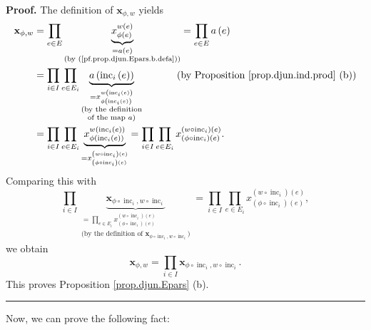 \documentclass[numbers=enddot,12pt,final,onecolumn,notitlepage,abstracton]{scrartcl}
\theoremstyle{definition}
\newenvironment{proof}[1][Proof]{\noindent\textbf{#1.} }{\ \rule{0.5em}{0.5em}}
\let\prodnonlimits\prod
\renewcommand{\prod}{\prodnonlimits\limits}
\newenvironment{verlong}{}{}
\begin{document}
\begin{verlong}
\begin{footnotesize}
\begin{proof}
The definition of $\mathbf{x}_{\phi,w}$ yields%
\begin{align*}
\mathbf{x}_{\phi,w}  &  =\prod_{e\in E}\underbrace{x_{\phi\left(  e\right)
}^{w\left(  e\right)  }}_{\substack{=a\left(  e\right)  \\\text{(by
(\ref{pf.prop.djun.Epars.b.defa}))}}}=\prod_{e\in E}a\left(  e\right) \\
&  =\prod_{i\in I}\prod_{e\in E_{i}}\underbrace{a\left(  \operatorname*{inc}%
\nolimits_{i}\left(  e\right)  \right)  }_{\substack{=x_{\phi\left(
\operatorname*{inc}\nolimits_{i}\left(  e\right)  \right)  }^{w\left(
\operatorname*{inc}\nolimits_{i}\left(  e\right)  \right)  }\\\text{(by the
definition}\\\text{of the map }a\text{)}}}\ \ \ \ \ \ \ \ \ \ \left(  \text{by
Proposition \ref{prop.djun.ind.prod} (b)}\right) \\
&  =\prod_{i\in I}\prod_{e\in E_{i}}\underbrace{x_{\phi\left(
\operatorname*{inc}\nolimits_{i}\left(  e\right)  \right)  }^{w\left(
\operatorname*{inc}\nolimits_{i}\left(  e\right)  \right)  }}_{=x_{\left(
\phi\circ\operatorname*{inc}\nolimits_{i}\right)  \left(  e\right)  }^{\left(
w\circ\operatorname*{inc}\nolimits_{i}\right)  \left(  e\right)  }}%
=\prod_{i\in I}\prod_{e\in E_{i}}x_{\left(  \phi\circ\operatorname*{inc}%
\nolimits_{i}\right)  \left(  e\right)  }^{\left(  w\circ\operatorname*{inc}%
\nolimits_{i}\right)  \left(  e\right)  }.
\end{align*}
Comparing this with%
\[
\prod_{i\in I}\underbrace{\mathbf{x}_{\phi\circ\operatorname*{inc}%
\nolimits_{i},w\circ\operatorname*{inc}\nolimits_{i}}}_{\substack{=\prod_{e\in
E_{i}}x_{\left(  \phi\circ\operatorname*{inc}\nolimits_{i}\right)  \left(
e\right)  }^{\left(  w\circ\operatorname*{inc}\nolimits_{i}\right)  \left(
e\right)  }\\\text{(by the definition of }\mathbf{x}_{\phi\circ
\operatorname*{inc}\nolimits_{i},w\circ\operatorname*{inc}\nolimits_{i}%
}\text{)}}}=\prod_{i\in I}\prod_{e\in E_{i}}x_{\left(  \phi\circ
\operatorname*{inc}\nolimits_{i}\right)  \left(  e\right)  }^{\left(
w\circ\operatorname*{inc}\nolimits_{i}\right)  \left(  e\right)  },
\]
we obtain%
\[
\mathbf{x}_{\phi,w}=\prod_{i\in I}\mathbf{x}_{\phi\circ\operatorname*{inc}%
\nolimits_{i},w\circ\operatorname*{inc}\nolimits_{i}}.
\]
This proves Proposition \ref{prop.djun.Epars} (b).
\end{proof}

Now, we can prove the following fact:


\end{footnotesize}
\end{verlong}
\end{document}
